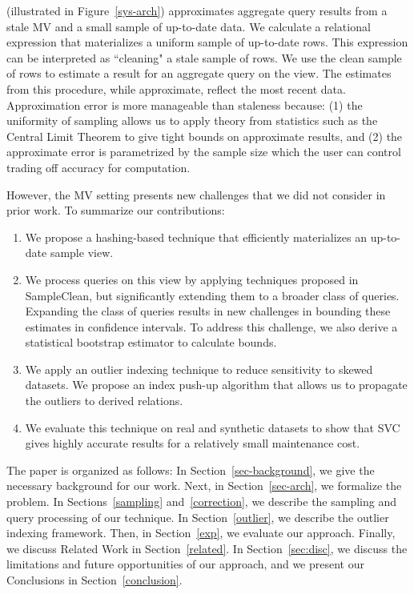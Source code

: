 \svcfull (\svc illustrated in Figure~\ref{sys-arch}) approximates aggregate query results from a stale MV and a small sample of up-to-date data.
We calculate a relational expression that materializes a uniform sample of up-to-date rows.
This expression can be interpreted as ``cleaning" a stale sample of rows.
We use the clean sample of rows to estimate a result for an aggregate query on the view.
The estimates from this procedure, while approximate, reflect the most recent data. 
Approximation error is more manageable than staleness because: (1) the uniformity of sampling allows us to apply theory from statistics such as the Central Limit Theorem to give tight bounds on approximate results, and (2) the approximate error is parametrized by the sample size which the user can control trading off accuracy for computation.

However, the MV setting presents new challenges that we did not consider in prior work.
To summarize our contributions:
\begin{enumerate}[noitemsep]
\item We propose a hashing-based technique that efficiently materializes an up-to-date sample view.
\item We process queries on this view by applying techniques proposed in SampleClean, but significantly extending them to a broader class of queries. Expanding the class of queries results in new challenges in bounding these estimates in confidence intervals. To address this challenge, we also derive a statistical bootstrap estimator to calculate bounds.
\item We apply an outlier indexing technique to reduce sensitivity to skewed datasets. %
We propose an index push-up algorithm that allows us to propagate the outliers to derived relations.
\item We evaluate this technique on real and synthetic datasets to show that SVC gives highly accurate results for a relatively small maintenance cost.
\end{enumerate} 

The paper is organized as follows: 
In Section~\ref{sec-background}, we give the necessary background for our work.
Next, in Section~\ref{sec-arch}, we formalize the problem.
In Sections~\ref{sampling} and~\ref{correction}, we describe the sampling and query processing of our technique.
In Section~\ref{outlier}, we describe the outlier indexing framework.
Then, in Section~\ref{exp}, we evaluate our approach.
Finally, we discuss Related Work in Section~\ref{related}.
In Section~\ref{sec:disc}, we discuss the limitations and future opportunities of our approach, and we present our Conclusions in Section~\ref{conclusion}.
